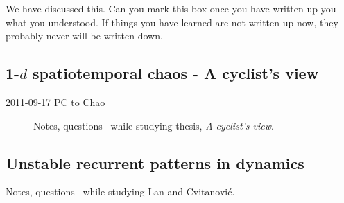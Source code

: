 \begin{description}
 We have discussed this. Can you mark this
box once you have written up you what you understood. If things you have
learned are not written up now, they probably never will be written down.

\end{description}


\subsection{1-$d$ spatiotemporal chaos - A cyclist's view}
\label{s:LanThesis}

\begin{description}

\item[2011-09-17 PC to Chao]
Notes, questions \etc\ while studying
thesis,
\emph{
           {A cyclist's view}}.

\end{description}

\subsection{Unstable recurrent patterns in {\KS} dynamics}
\label{s:lanCvit07}

Notes, questions \etc\ while studying Lan and Cvitanovi{\'c}.

